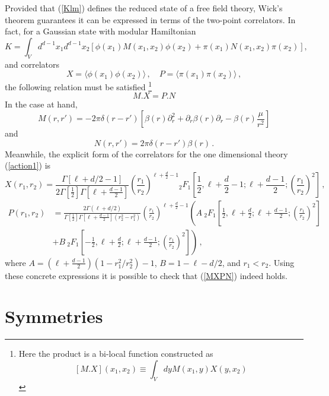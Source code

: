 \documentclass[12pt,a4paper]{article}
\newcommand{\be}{\begin{equation}}
\newcommand{\ee}{\end{equation}}
\def\be{\begin{equation}}
\def\ee{\end{equation}}
\begin{document}
Provided that (\ref{Klm}) defines the reduced state of a free field theory, Wick's theorem guarantees it can be expressed in terms of the two-point correlators. In fact, for a Gaussian state with modular Hamiltonian
\begin{equation}
K=\int_V d^{d-1} x_1 d^{d-1}x_2 \left[\phi(x_1) M(x_1, x_2) \phi(x_2)+\pi(x_1) N(x_1, x_2) \pi(x_2)\right],
\end{equation}
and correlators
\begin{equation}
X=\langle \phi(x_1) \phi(x_2) \rangle\, , \quad P=\langle \pi(x_1) \pi(x_2) \rangle\, ,
\end{equation}
the following relation must be satisfied \cite{Casini:2009sr}\footnote{Here the product is a bi-local function constructed as $$ \left[M.X\right](x_1, x_2)\equiv \int_V d y M(x_1, y) X(y, x_2)$$}
\begin{equation}\label{MXPN}
M.X=P.N
\end{equation}
In the case at hand, 
\be
M(r,r')=-2\pi \delta(r-r')\left[\beta(r)\partial_r^2+\partial_r\beta(r) \partial_r-\beta(r) \frac{\mu}{r^2}\right]
\label{M1d}
\ee
and
\be 
N(r,r')=2\pi\delta(r-r')\beta(r)\,.
\label{N1d}
\ee
Meanwhile, the explicit form of the correlators for the one dimensional theory (\ref{action1}) is \cite{Saharian:2000mw}
\begin{equation}
X(r_1, r_2)=\frac{\Gamma\left[\ell+d/2-1\right]}{2\Gamma\left[\frac{1}{2}\right]\Gamma\left[\ell+\frac{d-1}{2}\right]}\left(\frac{r_1}{r_2}\right)^{\ell+\frac{d}{2}-1} {}_2 F_1 \left[ \frac{1}{2}, \ell+\frac{d}{2}-1; \ell+\frac{d-1}{2}; \left(\frac{r_1}{r_2}\right)^2\right]\, ,
\end{equation}
\begin{equation}
\begin{split}
P(r_1, r_2)&=\frac{2 \Gamma(\ell+d/2)}{\Gamma\left[\frac{1}{2}\right]\Gamma\left[\ell+\frac{d-1}{2}\right](r_2^2-r_1^2)}\left(\frac{r_1}{r_2}\right)^{\ell+\frac{d}{2}-1}\left(A ~ {}_2 F_1 \left[ \frac{1}{2}, \ell+\frac{d}{2}; \ell+\frac{d-1}{2}; \left(\frac{r_1}{r_2}\right)^2\right]\right.\\
& \left. + B ~ {}_2 F_1 \left[ -\frac{1}{2}, \ell+\frac{d}{2}; \ell+\frac{d-1}{2}; \left(\frac{r_1}{r_2}\right)^2\right]\right)\, ,
\end{split}
\end{equation}
where $A=\left(\ell+\frac{d-1}{2}\right)\left(1-r_1^2/r_2^2\right)-1$, $B=1-\ell-d/2$, and $r_1<r_2$. Using these concrete expressions it is possible to check that (\ref{MXPN}) indeed holds.
\section{Symmetries}\label{sec:symmetries}
\end{document}

